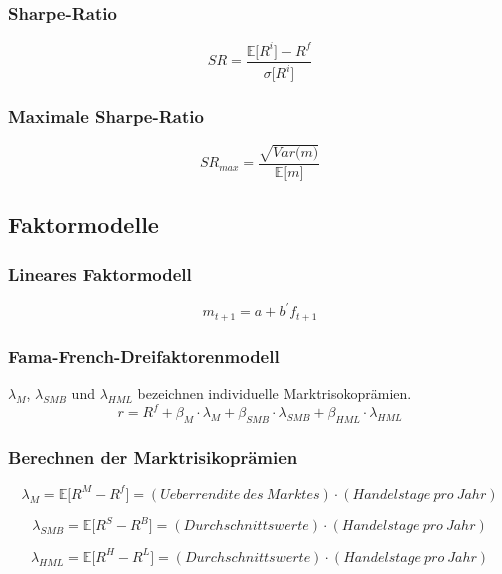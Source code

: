 \subsubsection{Sharpe-Ratio}
\begin{equation}
	SR = \frac{\mathbb{E} \big\lbrack R^i \big\rbrack - R^f}{\sigma \big\lbrack R^i \big\rbrack}
\end{equation}

\subsubsection{Maximale Sharpe-Ratio}
\begin{equation}
	SR_{max} = \frac{\sqrt{Var \big( m \big)}}{\mathbb{E} \big\lbrack m \big\rbrack}
\end{equation}


\subsection{Faktormodelle}

\subsubsection{Lineares Faktormodell}
\begin{equation}
	m_{t+1} = a + b^\prime f_{t+1} \label{eq:lfm}
\end{equation}

\subsubsection{Fama-French-Dreifaktorenmodell}

\(\lambda_M\), \(\lambda_{SMB}\) und \(\lambda_{HML}\) bezeichnen individuelle Marktrisokoprämien.
\begin{equation}
	r = R^f + \beta_M \cdot \lambda_M + \beta_{SMB} \cdot \lambda_{SMB} + \beta_{HML} \cdot \lambda_{HML} \label{eq:ff}
\end{equation}

\subsubsection{Berechnen der Marktrisikoprämien}
\begin{equation}
	\lambda_M = \mathbb{E} \big\lbrack R^M - R^f \big\rbrack = (Ueberrendite~des~Marktes) \cdot (Handelstage~pro~Jahr)
\end{equation}

\begin{equation}
	\lambda_{SMB} = \mathbb{E} \big\lbrack R^S - R^B \big\rbrack = (Durchschnittswerte) \cdot (Handelstage~pro~Jahr)
\end{equation}

\begin{equation}
	\lambda_{HML} = \mathbb{E} \big\lbrack R^H - R^L \big\rbrack = (Durchschnittswerte) \cdot (Handelstage~pro~Jahr)
\end{equation}
